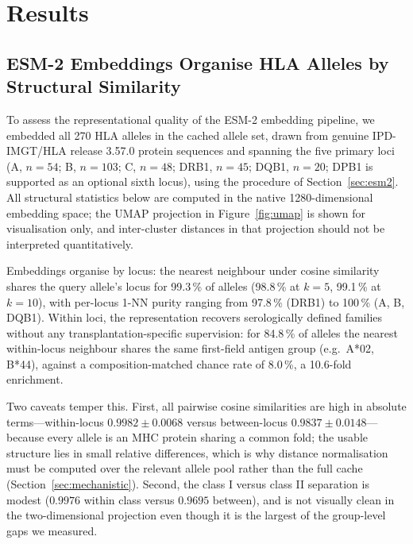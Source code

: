\documentclass[11pt,a4paper]{article}
\begin{document}
\section{Results}

\subsection{ESM-2 Embeddings Organise HLA Alleles by Structural Similarity}

To assess the representational quality of the ESM-2 embedding pipeline, we
embedded all 270 HLA alleles in the cached allele set, drawn from genuine
IPD-IMGT/HLA release 3.57.0 protein sequences and spanning the five primary
loci (A, $n=54$; B, $n=103$; C, $n=48$; DRB1, $n=45$; DQB1, $n=20$; DPB1 is
supported as an optional sixth locus), using the procedure of
Section~\ref{sec:esm2}.  All structural statistics below are computed in the
native 1280-dimensional embedding space; the UMAP projection
\citep{mcinnes2018umap} in Figure~\ref{fig:umap} is shown for visualisation
only, and inter-cluster distances in that projection should not be
interpreted quantitatively.

Embeddings organise by locus: the nearest neighbour under cosine similarity
shares the query allele's locus for 99.3\,\% of alleles (98.8\,\% at $k=5$,
99.1\,\% at $k=10$), with per-locus 1-NN purity ranging from 97.8\,\% (DRB1)
to 100\,\% (A, B, DQB1).  Within loci, the representation recovers
serologically defined families without any transplantation-specific
supervision: for 84.8\,\% of alleles the nearest within-locus neighbour shares
the same first-field antigen group (e.g.\ A*02, B*44), against a
composition-matched chance rate of 8.0\,\%, a 10.6-fold enrichment.

Two caveats temper this.  First, all pairwise cosine similarities are high in
absolute terms---within-locus $0.9982 \pm 0.0068$ versus between-locus
$0.9837 \pm 0.0148$---because every allele is an MHC protein sharing a common
fold; the usable structure lies in small relative differences, which is why
distance normalisation must be computed over the relevant allele pool rather
than the full cache (Section~\ref{sec:mechanistic}).  Second, the class I
versus class II separation is modest ($0.9976$ within class versus $0.9695$
between), and is not visually clean in the two-dimensional projection even
though it is the largest of the group-level gaps we measured.
\end{document}
